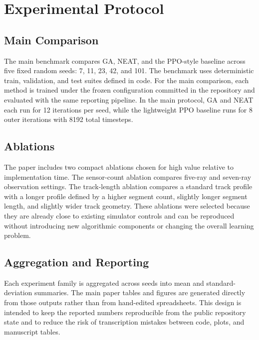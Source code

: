 \section{Experimental Protocol}

\subsection{Main Comparison}

The main benchmark compares GA, NEAT, and the PPO-style baseline across five fixed random seeds: 7, 11, 23, 42, and 101. The benchmark uses deterministic train, validation, and test suites defined in code. For the main comparison, each method is trained under the frozen configuration committed in the repository and evaluated with the same reporting pipeline. In the main protocol, GA and NEAT each run for 12 iterations per seed, while the lightweight PPO baseline runs for 8 outer iterations with 8192 total timesteps.

\subsection{Ablations}

The paper includes two compact ablations chosen for high value relative to implementation time. The sensor-count ablation compares five-ray and seven-ray observation settings. The track-length ablation compares a standard track profile with a longer profile defined by a higher segment count, slightly longer segment length, and slightly wider track geometry. These ablations were selected because they are already close to existing simulator controls and can be reproduced without introducing new algorithmic components or changing the overall learning problem.

\subsection{Aggregation and Reporting}

Each experiment family is aggregated across seeds into mean and standard-deviation summaries. The main paper tables and figures are generated directly from those outputs rather than from hand-edited spreadsheets. This design is intended to keep the reported numbers reproducible from the public repository state and to reduce the risk of transcription mistakes between code, plots, and manuscript tables.


